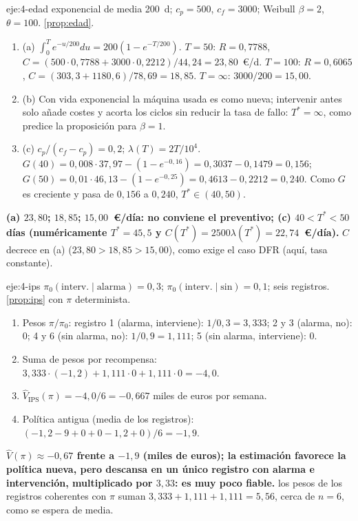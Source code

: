 \begin{solucion}{eje:4-edad}
\datos exponencial de media 200~d; $c_p=500$, $c_f=3000$; Weibull $\beta=2$, $\theta=100$.
\planteamiento \cref{prop:edad}.
\pasos
\begin{enumerate}[label=\arabic*.]
  \item (a) $\int_0^{T}e^{-u/200}du=200(1-e^{-T/200})$. $T=50$: $R=0{,}7788$, $C=(500\cdot0{,}7788+3000\cdot0{,}2212)/44{,}24=23{,}80$~€/d. $T=100$: $R=0{,}6065$, $C=(303{,}3+1180{,}6)/78{,}69=18{,}85$. $T=\infty$: $3000/200=15{,}00$.
  \item (b) Con vida exponencial la máquina usada es como nueva; intervenir antes solo añade costes y acorta los ciclos sin reducir la tasa de fallo: $T^{*}=\infty$, como predice la proposición para $\beta=1$.
  \item (c) $c_p/(c_f-c_p)=0{,}2$; $\lambda(T)=2T/10^{4}$. $G(40)=0{,}008\cdot37{,}97-(1-e^{-0{,}16})=0{,}3037-0{,}1479=0{,}156$; $G(50)=0{,}01\cdot46{,}13-(1-e^{-0{,}25})=0{,}4613-0{,}2212=0{,}240$. Como $G$ es creciente y pasa de $0{,}156$ a $0{,}240$, $T^{*}\in(40,50)$.
\end{enumerate}
\resultado \textbf{(a) $23{,}80$; $18{,}85$; $15{,}00$~€/día: no conviene el preventivo; (c) $40<T^{*}<50$ días (numéricamente $T^{*}=45{,}5$ y $C(T^{*})=2500\lambda(T^{*})=22{,}74$~€/día).}
\comprobacion $C$ decrece en (a) ($23{,}80>18{,}85>15{,}00$), como exige el caso DFR (aquí, tasa constante).
\end{solucion}

\begin{solucion}{eje:4-ips}
\datos $\pi_0(\text{interv.}\mid\text{alarma})=0{,}3$; $\pi_0(\text{interv.}\mid\text{sin})=0{,}1$; seis registros.
\planteamiento \cref{prop:ips} con $\pi$ determinista.
\pasos
\begin{enumerate}[label=\arabic*.]
  \item Pesos $\pi/\pi_0$: registro 1 (alarma, interviene): $1/0{,}3=3{,}333$; 2 y 3 (alarma, no): $0$; 4 y 6 (sin alarma, no): $1/0{,}9=1{,}111$; 5 (sin alarma, interviene): $0$.
  \item Suma de pesos por recompensa: $3{,}333\cdot(-1{,}2)+1{,}111\cdot0+1{,}111\cdot0=-4{,}0$.
  \item $\hat V_{\mathrm{IPS}}(\pi)=-4{,}0/6=-0{,}667$ miles de euros por semana.
  \item Política antigua (media de los registros): $(-1{,}2-9+0+0-1{,}2+0)/6=-1{,}9$.
\end{enumerate}
\resultado \textbf{$\hat V(\pi)\approx-0{,}67$ frente a $-1{,}9$ (miles de euros); la estimación favorece la política nueva, pero descansa en un único registro con alarma e intervención, multiplicado por $3{,}33$: es muy poco fiable.}
\comprobacion los pesos de los registros coherentes con $\pi$ suman $3{,}333+1{,}111+1{,}111=5{,}56$, cerca de $n=6$, como se espera de media.
\end{solucion}

